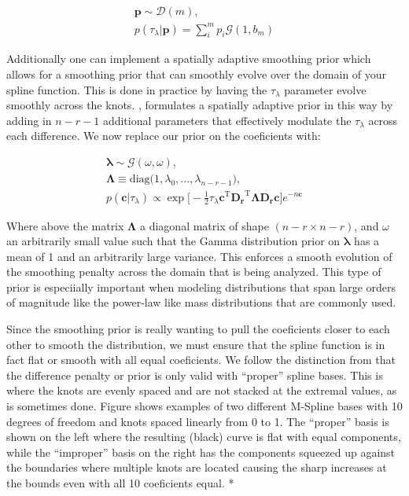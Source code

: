 \begin{align}
    \bm{p} \sim \mathcal{D}(m), \\
    p(\tau_\lambda | \bm{p}) = \sum_i^m p_i \mathcal{G}(1, b_m)
\end{align}

Additionally one can implement a spatially adaptive smoothing prior which allows for a smoothing prior
that can smoothly evolve over the domain of your spline function. This is done in practice by having the $\tau_\lambda$ parameter evolve smoothly
across the knots. , formulates a spatially adaptive prior in this way by adding in $n-r-1$ additional parameters that
effectively modulate the $\tau_\lambda$ across each difference. We now replace our prior on the coeficients with:

\begin{eqnarray}
\bm{\lambda} \sim \mathcal{G}(\omega, \omega), \\
\bm{\Lambda} \equiv \mathrm{diag}\big(1, \lambda_0,...,\lambda_{n-r-1}\big), \\
p(\bm{c} | \tau_\lambda) \propto \exp \big[ -\frac{1}{2} \tau_\lambda \bm{c}^{\mathrm{T}} \bm{D_r}^{\mathrm{T}} \bm{\Lambda} \bm{D_r} \bm{c} \big] e^{-n\bm{c}}
\end{eqnarray}

Where above the matrix $\bm{\Lambda}$ a diagonal matrix of shape $(n-r \times n-r)$, and $\omega$ an arbitrarily small value such that the Gamma distribution 
prior on $\bm{\lambda}$ has a mean of 1 and an arbitrarily large variance. This enforces a smooth evolution of the smoothing penalty 
across the domain that is being analyzed. This type of prior is especiially important when modeling distributions that span large orders of magnitude like 
the power-law like mass distributions that are commonly used. 

Since the smoothing prior is really wanting to pull the coeficients closer to each other to smooth the distribution, 
we must ensure that the spline function is in fact flat or smooth with all equal coeficients. We follow the distinction from  that the difference
penalty or prior is only valid with ``proper'' spline bases. This is where the knots are evenly spaced and are not stacked at the extremal values, 
as is sometimes done. Figure shows examples of two different M-Spline bases with 10 degrees of freedom and knots spaced linearly from 0 to 1. The ``proper''
basis is shown on the left where the resulting (black) curve is flat with equal components, while the ``improper'' basis on the right has the 
components squeezed up against the boundaries where multiple knots are located causing the sharp increases at the bounds even with all 10 coeficients equal.
*\